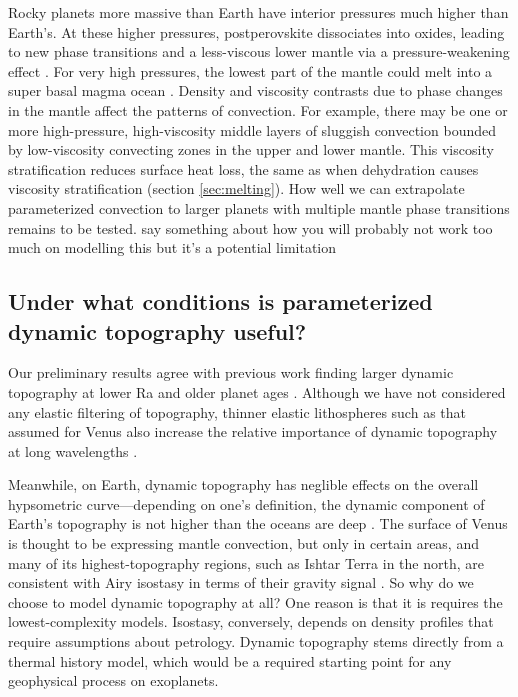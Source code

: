 Rocky planets more massive than Earth have interior pressures much higher than Earth's. At these higher pressures, postperovskite dissociates into oxides, leading to new phase transitions \citep[up to four, meaning a five-layered mantle;][]{vandenBerg2019} and a less-viscous lower mantle via a pressure-weakening effect \citep{Umemoto2011, Karato2011, Tackley2013, Umemoto2017, Shahnas2018, Ritterbex2018, vandenBerg2019}. For very high pressures, the lowest part of the mantle could melt into a super basal magma ocean \citep{Labrosse2007}. Density and viscosity contrasts due to phase changes in the mantle affect the patterns of convection. For example, there may be one or more high-pressure, high-viscosity middle layers of sluggish convection bounded by low-viscosity convecting zones in the upper and lower mantle. This viscosity stratification reduces surface heat loss, the same as when dehydration causes viscosity stratification (section \ref{sec:melting}). How well we can extrapolate parameterized convection to larger planets with multiple mantle phase transitions remains to be tested. %
{\color{red} say something about how you will probably not work too much on modelling this but it's a potential limitation}



\subsection{Under what conditions is parameterized dynamic topography useful?}

Our preliminary results agree with previous work finding larger dynamic topography at lower Ra and older planet ages \citep{Breuer2015}. Although we have not considered any elastic filtering of topography, thinner elastic lithospheres such as that assumed for Venus also increase the relative importance of dynamic topography at long wavelengths \citep{Golle2012, Dumoulin2013, Breuer2015}.

Meanwhile, on Earth, dynamic topography has neglible effects on the overall hypsometric curve---depending on one's definition, the dynamic component of Earth's topography is not higher than the oceans are deep \citep{Molnar2015, Hoggard2016}. The surface of Venus is thought to be expressing mantle convection, but only in certain areas, and many of its highest-topography regions, such as Ishtar Terra in the north, are consistent with Airy isostasy in terms of their gravity signal \citep{Grimm1991, Yang2016}. So why do we choose to model dynamic topography at all? One reason is that it is requires the lowest-complexity models. Isostasy, conversely, depends on density profiles that require assumptions about petrology. Dynamic topography stems directly from a thermal history model, which would be a required starting point for any geophysical process on exoplanets.

